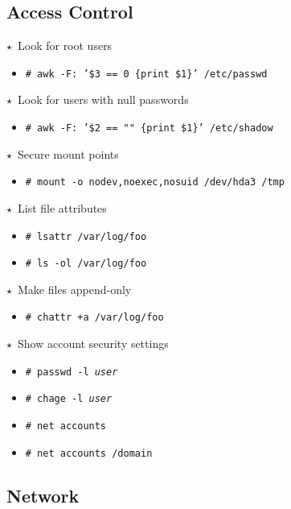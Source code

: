 \documentclass[10pt,landscape]{article}
\newcommand{\os}[1]{\texttt{\footnotesize{#1}}}
\newcommand{\bsd}{\os{B}}
\newcommand{\unix}{\os{U}}
\newcommand{\linux}{\os{L}}
\newcommand{\windows}{\os{W}}
\newenvironment{action}[1]
  {\begin{minipage}[c]{\linewidth}$\star$~#1\begin{itemize}[leftmargin=1cm]}
  {\end{itemize}\end{minipage}\vspace*{3pt}}
\newcommand{\cmd}[2]{\item[#1] {\small\tt\# #2}}
\begin{document}
\begin{multicols*}{3}
\subsection*{Access Control}

\begin{action}{Look for root users}
\cmd{\unix}{awk -F: '\$3 == 0 \{print \$1\}' /etc/passwd}
\end{action}

\begin{action}{Look for users with null passwords}
\cmd{\unix}{awk -F: '\$2 == "" \{print \$1\}' /etc/shadow}
\end{action}

\begin{action}{Secure mount points}
\cmd{\unix}{mount -o nodev,noexec,nosuid /dev/hda3 /tmp}
\end{action}

\begin{action}{List file attributes}
\cmd{\linux}{lsattr /var/log/foo}
\cmd{\bsd}{ls -ol /var/log/foo}
\end{action}

\begin{action}{Make files append-only}
\cmd{\linux}{chattr +a /var/log/foo}
\end{action}

\begin{action}{Show account security settings}
\cmd{\unix}{passwd -l \emph{user}}
\cmd{\linux}{chage -l \emph{user}}
\cmd{\windows}{net accounts}
\cmd{\windows}{net accounts /domain}
\end{action}

\subsection*{Network}


\end{multicols*}
\end{document}
